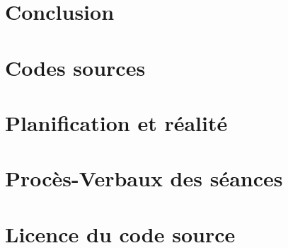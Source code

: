 \documentclass[
    reds, %
    ie, %
]{heig-tb}
\begin{document}
\chapter{Conclusion}


\appendix
\appendixpage
\addappheadtotoc

\chapter{Codes sources}

\chapter{Planification et réalité}

\chapter{Procès-Verbaux des séances}

\chapter{Licence du code source}



\let\cleardoublepage\clearpage
\backmatter
\label{glossaire}
\printnoidxglossary
\printbibliography
\label{index}
\printindex
\end{document}
